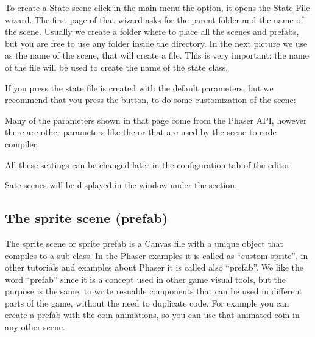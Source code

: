 \documentclass[letterpaper,10pt,english]{sphinxmanual}
\begin{document}
\begin{sphinxVerbatim}[commandchars=\\\{\}]
           


\end{sphinxVerbatim}

To create a State scene click in the main menu the  option, it opens the State File wizard. The first page of that wizard asks for the parent folder and the name of the scene. Usually we create a  folder where to place all the scenes and prefabs, but you are free to use any folder inside the  directory. In the next picture we use  as the name of the scene, that will create a  file. This is very important: the name of the file will be used to create the name of the state class.

\noindent{}

If you press  the state file is created with the default parameters, but we recommend that you press the  button, to do some customization of the scene:

\noindent{}

Many of the parameters shown in that page come from the Phaser API, however there are other parameters like the  or  that are used by the scene-to-code compiler.

All these settings can be changed later in the configuration tab of the editor.

Sate scenes will be displayed in the  window under the  section.


\subsection{The sprite scene (prefab)}
\label{\detokenize{canvas:the-sprite-scene-prefab}}
The sprite scene or sprite prefab is a Canvas file with a unique object that compiles to a  sub-class. In the Phaser examples it is called as “custom sprite”, in other tutorials and examples about Phaser it is called also “prefab”. We like the word “prefab” since it is a concept used in other game visual tools, but the purpose is the same, to write resuable components that can be used in different parts of the game, without the need to duplicate code. For example you can create a  prefab with the coin animations, so you can use that animated coin in any other scene.
\end{document}
